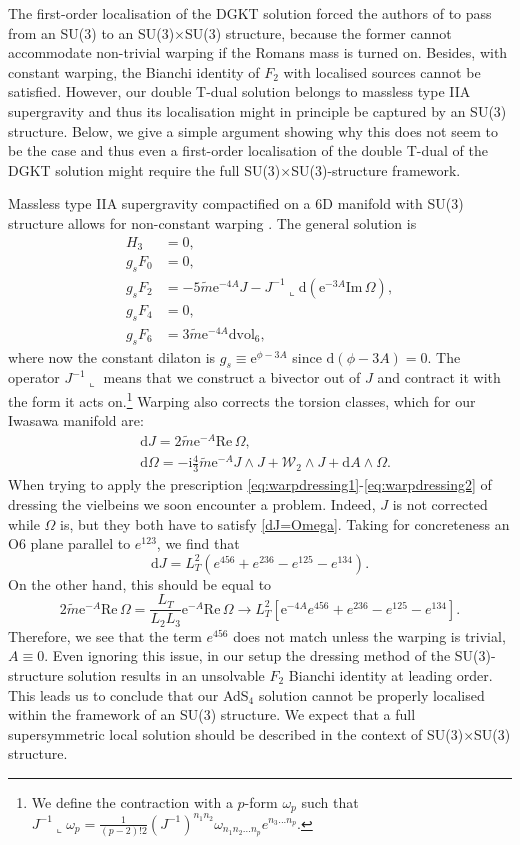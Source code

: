 \documentclass[11pt]{article}
\newcommand{\be}{\begin{equation}}
\newcommand{\ee}{\end{equation}}
\def\be{\begin{equation}}
\def\ee{\end{equation}}
\renewcommand{\[}{\left[}
\renewcommand{\]}{\right]}
\renewcommand{\(}{\left(}
\renewcommand{\)}{\right)}
\renewcommand{\Im}{\text{Im}\,}
\renewcommand{\Re}{\text{Re}\,}
\renewcommand{\d}{\textrm{d}}
\newcommand{\rmi}{\textrm{i}}
\newcommand{\e}{\textrm{e}}
\newcommand{\dd}{\mathrm{d}}
\newcommand{\<}{\langle}
\renewcommand{\>}{\rangle}
\begin{document}
The first-order localisation of the DGKT solution forced the authors of \cite{Marchesano:2020qvg} to pass from an SU(3) to an SU(3)$\times$SU(3) structure, because the former cannot accommodate non-trivial warping if the Romans mass is turned on. Besides, with constant warping, the Bianchi identity of $F_2$ with localised sources cannot be satisfied. However, our double T-dual solution belongs to massless type IIA supergravity and thus its localisation might in principle be captured by an SU(3) structure. Below, we give a simple argument showing why this does not seem to be the case and thus even a first-order localisation of the double T-dual of the DGKT solution might require the full SU(3)$\times$SU(3)-structure framework.

Massless type IIA supergravity compactified on a 6D manifold with SU(3) structure allows for non-constant warping \cite{Koerber:2010bx}. The general solution is
\begin{align}
    H_3 &= 0,\\
    g_s F_0 &= 0,\\
    g_s F_2 &= -5 \tilde{m} \e^{-4A} J  - J^{-1}\llcorner \dd \left(\e^{-3A} \Im \Omega \right),\\
    g_s F_4 &= 0,\\
    g_s F_6 &= 3\tilde{m}\e^{-4A}\text{dvol}_6,
\end{align}
where now the constant dilaton is $g_s \equiv \e^{\phi-3A}$ since $\d (\phi-3A)=0$. The operator ${J}^{-1}\llcorner$ means that we construct a bivector out of $J$ and contract it with the form it acts on.\footnote{We define the contraction with a $p$-form $\omega_p$ such that $J^{-1} \llcorner \omega_p = \frac{1}{(p-2)!2} (J^{-1})^{n_1n_2} \omega_{n_1n_2\ldots n_p} e^{n_3...n_p}$.} Warping also corrects the torsion classes, which for our Iwasawa manifold are:
\begin{align}
\label{dJ=Omega}
    &\dd J = 2 \tilde{m} \e^{-A} \Re \Omega,\\
    &\dd \Omega = - \rmi \frac{4}{3}  \tilde{m}\e^{-A} J \wedge J + \mathcal{W}_2 \wedge J + \dd A \wedge \Omega.
\end{align}
When trying to apply the prescription \eqref{eq:warpdressing1}-\eqref{eq:warpdressing2} of dressing the vielbeins we soon encounter a problem. Indeed, $J$ is not corrected while $\Omega$ is, but they both have to satisfy \eqref{dJ=Omega}. Taking for concreteness an O6 plane parallel to $e^{123}$, we find that
\be
\dd J = L_T^2( e^{456}+e^{236}- e^{125}-e^{134}).
\ee
On the other hand, this should be equal to 
\be
2 \tilde{m} \e^{-A} \Re \Omega=	\frac{L_T}{L_2 L_3}\e^{-A} \Re \Omega \rightarrow L_T^2\left[ \e^{-4A} e^{456} + e^{236}-e^{125} - e^{134}  \right].
\ee
Therefore, we see that the term $e^{456}$ does not match unless the warping is trivial, $A \equiv 0$. Even ignoring this issue, in our setup the dressing method of the SU(3)-structure solution results in an unsolvable $F_2$ Bianchi identity at leading order. This leads us to conclude that our AdS$_4$ solution cannot be properly localised within the framework of an SU(3) structure. We expect that a full supersymmetric local solution should be described in the context of SU(3)$\times$SU(3) structure.
\end{document}
